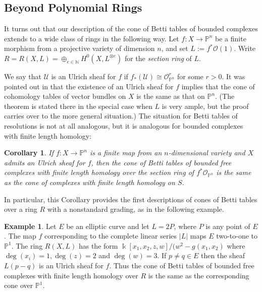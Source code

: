 \documentclass[12pt]{amsart}
\newtheorem{cor}[lemma]{Corollary}
\theoremstyle{definition}
\newtheorem{example}[lemma]{Example}
\theoremstyle{remark}
\newcommand{\kk}{\Bbbk}
\newcommand{\PP}{\mathbb{P}}
\newcommand{\cO}{\mathcal{O}}
\newcommand{\cU}{\mathcal{U}}
\newcommand{\defi}[1]{\textsf{#1}} %
\newcommand{\david}[1]{{\color{red} \sf $\clubsuit\clubsuit\clubsuit$ David: [#1]}}
\renewcommand{\P}{{\mathbb P}}
\begin{document}
\subsection*{Beyond Polynomial Rings}
It turns out that our description of the cone of Betti tables of bounded complexes
extends to a wide class of rings in the following way. Let $f:X\to \PP^{n}$ be a finite
morphism from a projective variety of dimension $n$, and set $L:=f^*\cO(1)$. 
Write $R=R(X,L)=\oplus_{e\in \mathbb N} H^0(X,L^{\otimes e})$ for the \emph{section ring}
of $L$.

We say that $\cU$ is an \defi{Ulrich sheaf} for $f$ if $f_*(\cU)\cong \cO_{\PP^n}^r$ for some $r>0$.  It was pointed out in \cite[Theorem~5]{eis-schrey-abel} that the existence of an Ulrich sheaf for $f$ implies that  the cone of cohomology tables of vector bundles on $X$ is the same as that on $\PP^{n}$. (The theorem is stated there in the special case when $L$ is very ample, but the proof
carries over to the more general situation.) The situation for Betti tables of resolutions is not at all analogous, but it is analogous for bounded complexes with finite length homology:


\begin{cor}\label{cor:isom cones}
If $f:X\to \P^{n}$ is a  finite map from an $n$-dimensional variety and $X$ admits an Ulrich sheaf for $f$, then the cone of Betti tables
of bounded free complexes with finite length homology over  the section ring
of $f^{*}\cO_{\P^{n}}$ is the same
as the cone of complexes with finite length homology  on $S$. 
\end{cor}

 In particular, this Corollary provides the first descriptions of cones of Betti tables over a ring $R$ with a nonstandard grading, as in the following example.

\begin{example}\label{ex:elliptic}
Let $E$ be an elliptic curve and let $L=2P$, where $P$ is any point of $E$.  The map $f$ corresponding to the complete
linear series $|L|$ maps $E$ two-to-one to $\P^{1}$. The ring $R(X,L)$ has the form
$\kk[x_1,x_2,z,w]/(w^{2}-g(x_{1},x_{2})$  where $\deg(x_i)=1, \deg(z)=2$ and $\deg(w)=3$. 
If $p\neq q\in E$ then the sheaf $L(p-q)$ is an Ulrich sheaf for $f$. Thus the cone of
Betti tables of bounded free complexes with finite length homology over $R$ is the same
as the corresponding cone over $\P^{1}$.
\end{example}
\end{document}
